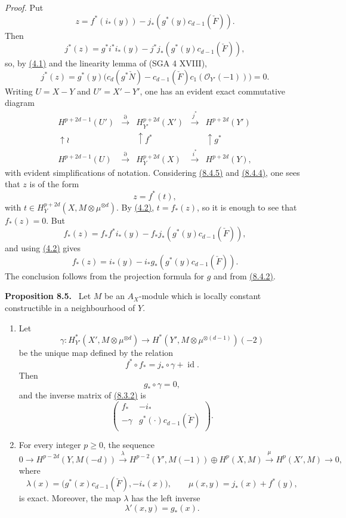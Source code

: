 \documentclass[11pt]{article}
\newenvironment{statement}[1]{\par\medskip\noindent\textbf{#1.}\ }{\par\medskip}
\begin{document}
\emph{Proof.} Put
\[
z=f^*(i_*(y))-j_*(g^*(y)c_{d-1}(\check F)).
\]
Then
\[
j^*(z)=g^*i^*i_*(y)-j^*j_*(g^*(y)c_{d-1}(\check F)),
\]
so, by \hyperref[sga5:VII:theorem:4.1]{(4.1)} and the linearity lemma of (SGA 4 XVIII),
\[
j^*(z)=g^*(y)\bigl(c_d(g^*\check N)-c_{d-1}(\check F)c_1(\mathcal O_{Y'}(-1))\bigr)=0.
\tag{8.4.4}\label{sga5:VII:equation:8.4.4}
\]
Writing $U=X-Y$ and $U'=X'-Y'$, one has an evident exact commutative diagram
\[
\begin{array}{ccccc}
H^{p+2d-1}(U')&\xrightarrow{\partial}&H^{p+2d}_{Y'}(X')&\xrightarrow{j^*}&H^{p+2d}(Y')\\
\uparrow\wr&&\uparrow f^*&&\uparrow g^*\\
H^{p+2d-1}(U)&\xrightarrow{\partial}&H_Y^{p+2d}(X)&\xrightarrow{i^*}&H^{p+2d}(Y),
\end{array}
\tag{8.4.5}\label{sga5:VII:equation:8.4.5}
\]
with evident simplifications of notation. Considering \hyperref[sga5:VII:equation:8.4.5]{(8.4.5)} and \hyperref[sga5:VII:equation:8.4.4]{(8.4.4)}, one sees that $z$ is of the form
\[
z=f^*(t),
\]
with $t\in H_Y^{p+2d}(X,M\otimes\mu^{\otimes d})$. By \hyperref[sga5:VII:lemma:4.2]{(4.2)}, $t=f_*(z)$, so it is enough to see that $f_*(z)=0$. But
\[
f_*(z)=f_*f^*i_*(y)-f_*j_*(g^*(y)c_{d-1}(\check F)),
\]
and using \hyperref[sga5:VII:lemma:4.2]{(4.2)} gives
\[
f_*(z)=i_*(y)-i_*g_*(g^*(y)c_{d-1}(\check F)).
\]
The conclusion follows from the projection formula for $g$ and from \hyperref[sga5:VII:equation:8.4.2]{(8.4.2)}.

\label{sga5:VII:proposition:8.5}\begin{statement}{Proposition 8.5}
Let $M$ be an $A_X$-module which is locally constant constructible in a neighbourhood of $Y$.
\begin{enumerate}[label=\alph*)]
\item Let
\[
\gamma:H_{Y'}^*(X',M\otimes\mu^{\otimes d})\to
H^*(Y',M\otimes\mu^{\otimes(d-1)})(-2)
\]
be the unique map defined by the relation
\[
f^*\circ f_* = j_*\circ\gamma+\operatorname{id}.
\tag{8.5.1}\label{sga5:VII:equation:8.5.1}
\]
Then
\[
g_*\circ\gamma=0,
\tag{8.5.2}\label{sga5:VII:equation:8.5.2}
\]
and the inverse matrix of \hyperref[sga5:VII:equation:8.3.2]{(8.3.2)} is
\[
\begin{pmatrix}
f_*&-i_*\\
-\gamma&g^*(\cdot)c_{d-1}(\check F)
\end{pmatrix}.
\tag{8.5.3}\label{sga5:VII:equation:8.5.3}
\]
\item For every integer $p\ge0$, the sequence
\[
0\to H^{p-2d}(Y,M(-d))
\xrightarrow{\lambda}
H^{p-2}(Y',M(-1))\oplus H^p(X,M)
\xrightarrow{\mu}
H^p(X',M)\to0,
\]
where
\[
\lambda(x)=\bigl(g^*(x)c_{d-1}(\check F),-i_*(x)\bigr),
\qquad
\mu(x,y)=j_*(x)+f^*(y),
\]
is exact. Moreover, the map $\lambda$ has the left inverse
\[
\lambda'(x,y)=g_*(x).
\]
\end{enumerate}
\end{statement}
\end{document}
